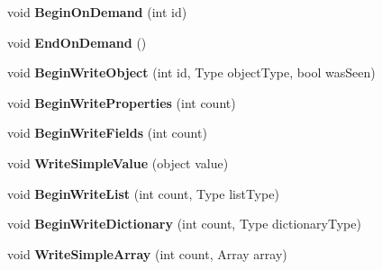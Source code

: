 \begin{DoxyCompactItemize}
\mbox{\label{class_serialization_1_1_binary_serializer_a6b09a7f66a88dc5488ed1fc5996f5452}} 
void {\bfseries Begin\+On\+Demand} (int id)
\item 
\mbox{\label{class_serialization_1_1_binary_serializer_a6a8d02da39538d740b84832d03a58766}} 
void {\bfseries End\+On\+Demand} ()
\item 
\mbox{\label{class_serialization_1_1_binary_serializer_ad2a4bb14be8f85f4de4539f8aaddac49}} 
void {\bfseries Begin\+Write\+Object} (int id, Type object\+Type, bool was\+Seen)
\item 
\mbox{\label{class_serialization_1_1_binary_serializer_a021a50d6702e32e15c197783a0bad05a}} 
void {\bfseries Begin\+Write\+Properties} (int count)
\item 
\mbox{\label{class_serialization_1_1_binary_serializer_a40709bdcdae381b2138a48e005e96ab2}} 
void {\bfseries Begin\+Write\+Fields} (int count)
\item 
\mbox{\label{class_serialization_1_1_binary_serializer_a91a35ade763c6b2def327e82a5ea7dad}} 
void {\bfseries Write\+Simple\+Value} (object value)
\item 
\mbox{\label{class_serialization_1_1_binary_serializer_a70c5b0751ea84a7db8cb2b4a89576db3}} 
void {\bfseries Begin\+Write\+List} (int count, Type list\+Type)
\item 
\mbox{\label{class_serialization_1_1_binary_serializer_afd9aec76b7b20ab88a9e3caca7470c8b}} 
void {\bfseries Begin\+Write\+Dictionary} (int count, Type dictionary\+Type)
\item 
\mbox{\label{class_serialization_1_1_binary_serializer_ad694b37d2693fb305f569bebe076b9f8}} 
void {\bfseries Write\+Simple\+Array} (int count, Array array)
\item 
\mbox{\label{class_serialization_1_1_binary_serializer_acbd47a7b1720dff38a36f4c645fe0df7}} 

\end{DoxyCompactItemize}
